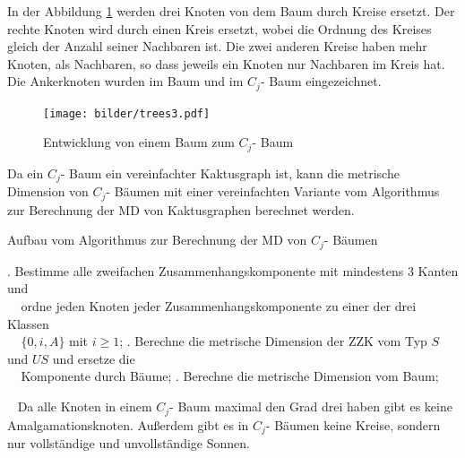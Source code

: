 \begin{bsp}
In der Abbildung \ref{c_jbaum} werden drei Knoten von dem Baum durch Kreise ersetzt. Der rechte Knoten wird durch einen Kreis ersetzt, wobei die Ordnung des Kreises gleich der Anzahl seiner Nachbaren ist. Die zwei anderen Kreise haben mehr Knoten, als Nachbaren, so dass jeweils ein Knoten nur Nachbaren im Kreis hat. Die Ankerknoten wurden im Baum und im $C_j$- Baum eingezeichnet.\\
\vspace{-4mm}
\begin{figure}[h!]
		\centering 		 
   \texttt{[image: bilder/trees3.pdf]}
	\caption{Entwicklung von einem Baum zum $C_{j}$- Baum}
	\label{c_jbaum}
  	 \end{figure}
\vspace{-4mm}
\end{bsp}
\begin{bem}
Da ein $C_j$- Baum ein vereinfachter Kaktusgraph ist, kann die metrische Dimension von $C_j$- Bäumen mit einer vereinfachten Variante vom Algorithmus zur Berechnung der MD von Kaktusgraphen berechnet werden.
\begin{algorithm}
\caption{Aufbau vom Algorithmus zur Berechnung der MD von $C_j$- Bäumen}
\begin{algorithmic}
. Bestimme alle zweifachen Zusammenhangskomponente mit mindestens 3 Kanten und\\$\;\;\;\;$ordne jeden Knoten jeder Zusammenhangskomponente zu einer der drei Klassen\\$\;\;\;\;\{0,i,A\}$ mit $i \geq 1$;
. Berechne die metrische Dimension der ZZK vom Typ $S$ und $US$ und ersetze die\\$\;\;\;\;$Komponente durch Bäume;
. Berechne die metrische Dimension vom Baum;
\end{algorithmic}
\end{algorithm}
~\linebreak
Da alle Knoten in einem $C_j$- Baum maximal den Grad drei haben gibt es keine Amalgamationsknoten. Außerdem gibt es in $C_j$- Bäumen keine Kreise, sondern nur vollständige und unvollständige Sonnen.
\end{bem}
